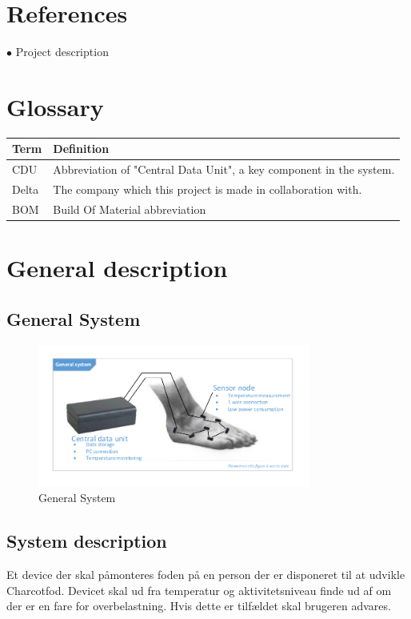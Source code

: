 \section{References}
$\bullet$ Project description

\section{Glossary}
\begin{table}[H]
\centering
\begin{tabular}{|p{4cm}|p{7cm}|}
\hline
Term & Definition\\ \hline
CDU & Abbreviation of "Central Data Unit", a key component in the system. \\ \hline
Delta & The company which this project is made in collaboration with.\\ \hline
BOM & Build Of Material abbreviation\\ \hline
\end{tabular}
\end{table}

\section{General description}

\subsection{General System}
\begin{figure}[H]
	\centering
	\includegraphics[width=0.8\textwidth]{billeder/GeneralSystem}
	\caption{General System}
\end{figure}

\subsection{System description}
Et device der skal påmonteres foden på en person der er disponeret til at udvikle Charcotfod. Devicet skal ud fra temperatur og aktivitetsniveau finde ud af om der er en fare for overbelastning. Hvis dette er tilfældet skal brugeren advares.

